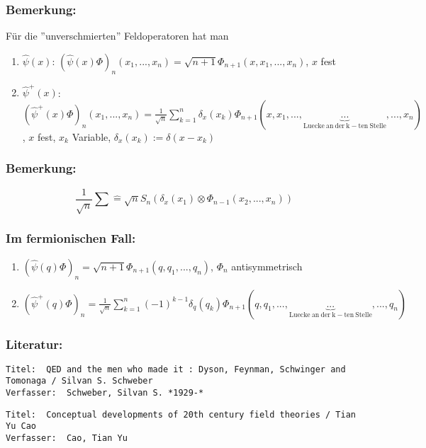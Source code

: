 \documentclass[twoside,a4paper]{scrartcl}
\renewcommand{\1}{\mathds{1}}
\begin{document}
\subsubsection*{Bemerkung:}
Für die ''unverschmierten'' Feldoperatoren hat man 
\begin{enumerate}
\item $\hat \psi(x)$: $(\hat \psi(x)\Phi)_n(x_1,...,x_n)=\sqrt{n+1}\Phi_{n+1}(x,x_1,...,x_n)$, $x$ fest
\item $\hat \psi^+(x)$: $(\hat \psi^+(x)\Phi)_n(x_1,...,x_n)=\frac{1}{\sqrt{n}}\sum_{k=1}^n \delta_x(x_k) \Phi_{n+1}(x,x_1,...,\underbrace{...}_{\mathrm{Luecke \ an \ der \ k-ten \ Stelle}},...,x_n)$, $x$ fest, $x_k$ Variable, $\delta_x(x_k):=\delta(x-x_k)$
\end{enumerate}
\subsubsection*{Bemerkung:}
$$\frac{1}{\sqrt{n}}\sum \mathrel{\widehat{=}} \sqrt{n} S_n(\delta_x(x_1)\otimes \Phi_{n-1}(x_2,...,x_n))$$
\subsubsection*{Im fermionischen Fall:}
\begin{enumerate}
\item $(\hat \psi(q)\Phi)_n=\sqrt{n+1}\Phi_{n+1}(q,q_1,...,q_n)$, $\Phi_n$ antisymmetrisch
\item $(\hat \psi^+(q)\Phi)_n=\frac{1}{\sqrt{n}}\sum_{k=1}^n (-1)^{k-1}\delta_q(q_k) \Phi_{n+1}(q,q_1,...,\underbrace{...}_{\mathrm{Luecke \ an \ der \ k-ten \ Stelle}},...,q_n)$
\end{enumerate}
\subsubsection*{Literatur:}
\begin{tiny}
\begin{verbatim}
Titel: 	QED and the men who made it : Dyson, Feynman, Schwinger and Tomonaga / Silvan S. Schweber
Verfasser: 	Schweber, Silvan S. *1929-*
\end{verbatim}
\end{tiny}


\begin{tiny}
\begin{verbatim}
Titel: 	Conceptual developments of 20th century field theories / Tian Yu Cao
Verfasser: 	Cao, Tian Yu
\end{verbatim}
\end{tiny}
\end{document}
